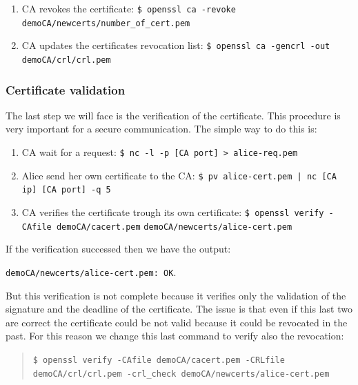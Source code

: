 \documentclass[11pt]{article}
\begin{document}
\begin{enumerate}
  \item CA revokes the certificate:\newline
  \texttt{\$ openssl ca -revoke demoCA/newcerts/number\_of\_cert.pem}

  \item CA updates the certificates revocation list:\newline
  \texttt{\$ openssl ca -gencrl -out demoCA/crl/crl.pem}\newline
\end{enumerate}

\subsubsection{Certificate validation}
The last step we will face is the verification of the certificate. This procedure is very important for a secure communication. The simple way to do this is:

\begin{enumerate}
  \item CA wait for a request:\newline
  \texttt{\$ nc -l -p [CA port] > alice-req.pem}

  \item Alice send her own certificate to the CA:\newline
  \texttt{\$ pv alice-cert.pem | nc [CA ip] [CA port] -q 5}

  \item CA verifies the certificate trough its own certificate:\newline
  \texttt{\$ openssl verify -CAfile demoCA/cacert.pem}\newline
  \texttt{demoCA/newcerts/alice-cert.pem}
\end{enumerate}

If the verification successed then we have the output:

\texttt{demoCA/newcerts/alice-cert.pem: OK}.

\bigskip
But this verification is not complete because it verifies only the validation of the signature and the deadline of the certificate. The issue is that even if this last two are correct the certificate could be not valid because it could be revocated in the past. For this reason we change this last command to verify also the revocation:

\begin{quote}
  \texttt{\$ openssl verify -CAfile demoCA/cacert.pem -CRLfile demoCA/crl/crl.pem -crl\_check demoCA/newcerts/alice-cert.pem}
\end{quote}
\end{document}
